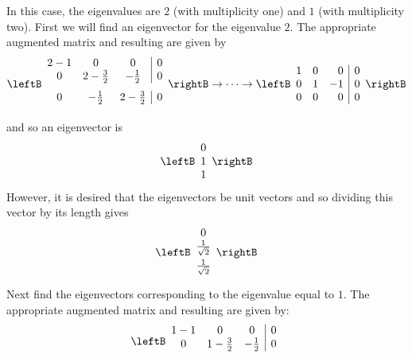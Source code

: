 \begin{solution}
In this case, the eigenvalues are $2$ (with multiplicity one) and $1$ (with multiplicity two). First
we will find an eigenvector for the eigenvalue $2$. The appropriate augmented matrix and resulting \rref \;are given by 
\begin{equation*}
\leftB
\begin{array}{ccc|c}
2-1 & 0 & 0 &  0 \\ 
0 & 2-\vspace{0.05in}\frac{3}{2} & -\vspace{0.05in}\frac{1}{2} & 0 \\ 
0 & -\vspace{0.05in}\frac{1}{2} & 2-\vspace{0.05in}\frac{3}{2} &  0
\end{array}
\rightB
\rightarrow \cdots \rightarrow
\leftB
\begin{array}{rrr|r}
1 & 0 & 0 & 0 \\ 
0 & 1 & -1 & 0 \\ 
0 & 0 & 0 & 0
\end{array}
\rightB
\end{equation*}
and so an eigenvector is 
\begin{equation*}
\leftB
\begin{array}{r}
0 \\ 
1 \\ 
1
\end{array}
\rightB 
\end{equation*}
However, it is desired that the eigenvectors be unit vectors
and so dividing this vector by its length gives 
\begin{equation*}
\leftB
\begin{array}{c}
0 \\ 
\vspace{0.05in}\frac{1}{\sqrt{2}} \\ 
\vspace{0.05in}\frac{1}{\sqrt{2}}
\end{array}
\rightB
\end{equation*}
Next find the eigenvectors corresponding to the eigenvalue equal to $1$. The appropriate augmented matrix and resulting \rref \;are given by:
\begin{equation*}
\leftB
\begin{array}{ccc|c}
1-1 & 0 & 0 & 0 \\ 
0 & 1-\vspace{0.05in}\frac{3}{2} & -\vspace{0.05in}\frac{1}{2} & 0 \\ 

\end{array}
\end{equation*}
\end{solution}
